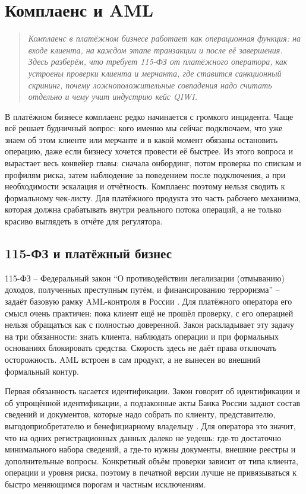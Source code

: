 
\chapter{Комплаенс и AML}
\label{ch:compliance-aml}
\begin{quote}
  \itshape
  Комплаенс в платёжном бизнесе работает как операционная функция:
  на входе клиента, на каждом этапе транзакции и после её завершения.
  Здесь разберём, что требует 115-ФЗ от платёжного оператора, как устроены
  проверки клиента и мерчанта, где ставится санкционный скрининг,
  почему ложноположительные совпадения надо считать отдельно и
  чему учит индустрию кейс QIWI.
\end{quote}

В платёжном бизнесе комплаенс редко начинается с громкого инцидента.
Чаще всё решает будничный вопрос: кого именно мы сейчас подключаем,
что уже знаем об этом клиенте или мерчанте и в какой момент обязаны
остановить операцию, даже если бизнесу хочется провести её быстрее.
Из этого вопроса и вырастает весь конвейер главы: сначала
онбординг, потом проверка по спискам и профилям риска, затем
наблюдение за поведением после подключения, а при необходимости
эскалация и отчётность. Комплаенс поэтому нельзя сводить к
формальному чек-листу. Для платёжного продукта это часть рабочего
механизма, которая должна срабатывать внутри реального потока
операций, а не только красиво выглядеть в отчёте для регулятора.

\section{115-ФЗ и платёжный бизнес}
\label{sec:compliance-115fz}

115-ФЗ -- Федеральный закон \enquote{О противодействии
легализации (отмыванию) доходов, полученных преступным путём, и
финансированию терроризма} -- задаёт базовую рамку AML-контроля в
России \cite{fz-115}. Для платёжного оператора его смысл очень
практичен: пока клиент ещё не прошёл проверку, с его операцией
нельзя обращаться как с полностью доверенной. Закон раскладывает
эту задачу на три обязанности: знать клиента, наблюдать операции и
при формальных основаниях блокировать средства. Скорость здесь не
даёт права отключать осторожность. AML встроен в сам продукт, а не
вынесен во внешний формальный контур.

Первая обязанность касается идентификации. Закон говорит об
идентификации и об упрощённой идентификации, а подзаконные акты Банка
России задают состав сведений и документов, которые надо собрать по
клиенту, представителю, выгодоприобретателю и бенефициарному
владельцу \cite{cbr-499p}. Для оператора это значит, что на
одних регистрационных данных далеко не уедешь: где-то достаточно
минимального набора сведений, а где-то нужны документы, внешние
реестры и дополнительные вопросы. Конкретный объём проверки зависит
от типа клиента, операции и уровня риска, поэтому в печатной версии
лучше не привязываться к быстро меняющимся порогам и частным
исключениям.

